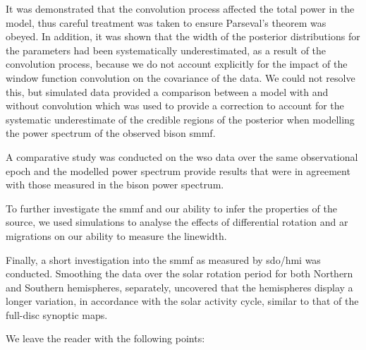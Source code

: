 It was demonstrated that the convolution process affected the total power in the model, thus careful treatment was taken to ensure Parseval's theorem was obeyed. In addition, it was shown that the width of the posterior distributions for the parameters had been systematically underestimated, as a result of the convolution process, because we do not account explicitly for the impact of the window function convolution on the covariance of the data. We could not resolve this, but simulated data provided a comparison between a model with and without convolution which was used to provide a correction to account for the systematic underestimate of the credible regions of the posterior when modelling the power spectrum of the observed \gls{bison} \gls{smmf}.

A comparative study was conducted on the \gls{wso} data over the same observational epoch and the modelled power spectrum provide results that were in agreement with those measured in the \gls{bison} power spectrum.

To further investigate the \gls{smmf} and our ability to infer the properties of the source, we used simulations to analyse the effects of differential rotation and \gls{ar} migrations on our ability to measure the linewidth.

Finally, a short investigation into the \gls{smmf} as measured by \gls{sdo/hmi} was conducted. Smoothing the data over the solar rotation period for both Northern and Southern hemispheres, separately, uncovered that the hemispheres display a longer variation, in accordance with the solar activity cycle, similar to that of the full-disc synoptic maps.

We leave the reader with the following points:

